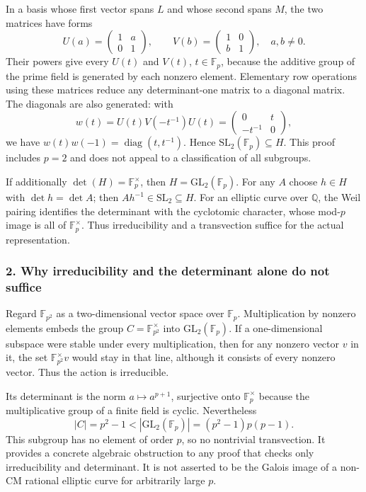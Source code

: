 \documentclass[11pt]{article}
\begin{document}
In a basis whose first vector spans $L$ and whose second spans $M$, the two matrices have forms
\[U(a)=\begin{pmatrix}1&a\\0&1\end{pmatrix},\qquad
V(b)=\begin{pmatrix}1&0\\b&1\end{pmatrix},\quad a,b\ne0.\]
Their powers give every $U(t)$ and $V(t)$, $t\in\mathbb F_p$, because the additive group of the prime field is generated by each nonzero element. Elementary row operations using these matrices reduce any determinant-one matrix to a diagonal matrix. The diagonals are also generated: with
\[w(t)=U(t)V(-t^{-1})U(t)=\begin{pmatrix}0&t\\-t^{-1}&0\end{pmatrix},\]
we have $w(t)w(-1)=\operatorname{diag}(t,t^{-1})$. Hence $\mathrm{SL}_2(\mathbb F_p)\subseteq H$. This proof includes $p=2$ and does not appeal to a classification of all subgroups.

If additionally $\det(H)=\mathbb F_p^\times$, then $H=\mathrm{GL}_2(\mathbb F_p)$. For any $A$ choose $h\in H$ with $\det h=\det A$; then $Ah^{-1}\in\mathrm{SL}_2\subseteq H$. For an elliptic curve over $\mathbb Q$, the Weil pairing identifies the determinant with the cyclotomic character, whose mod-$p$ image is all of $\mathbb F_p^\times$. Thus irreducibility and a transvection suffice for the actual representation.

\subsubsection{2. Why irreducibility and the determinant alone do not suffice}
Regard $\mathbb F_{p^2}$ as a two-dimensional vector space over $\mathbb F_p$. Multiplication by nonzero elements embeds the group $C=\mathbb F_{p^2}^\times$ into $\mathrm{GL}_2(\mathbb F_p)$. If a one-dimensional subspace were stable under every multiplication, then for any nonzero vector $v$ in it, the set $\mathbb F_{p^2}^\times v$ would stay in that line, although it consists of every nonzero vector. Thus the action is irreducible.

Its determinant is the norm $a\mapsto a^{p+1}$, surjective onto $\mathbb F_p^\times$ because the multiplicative group of a finite field is cyclic. Nevertheless
\[|C|=p^2-1<|\mathrm{GL}_2(\mathbb F_p)|=(p^2-1)p(p-1).\]
This subgroup has no element of order $p$, so no nontrivial transvection. It provides a concrete algebraic obstruction to any proof that checks only irreducibility and determinant. It is not asserted to be the Galois image of a non-CM rational elliptic curve for arbitrarily large $p$.
\end{document}
